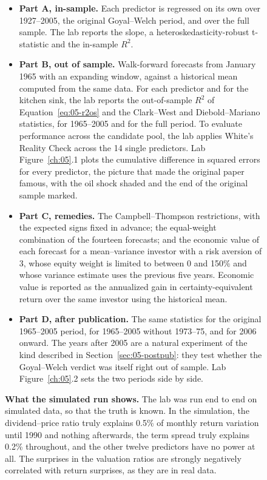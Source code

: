 \begin{figure}[htbp]
\begin{itemize}
  \item \textbf{Part A, in-sample.} Each predictor is regressed on its own over 1927--2005, the original Goyal--Welch period, and over the full sample. The lab reports the slope, a heteroskedasticity-robust t-statistic and the in-sample $R^2$.
  \item \textbf{Part B, out of sample.} Walk-forward forecasts from January 1965 with an expanding window, against a historical mean computed from the same data. For each predictor and for the kitchen sink, the lab reports the out-of-sample $R^2$ of Equation~\eqref{eq:05-r2os} and the Clark--West and Diebold--Mariano statistics, for 1965--2005 and for the full period. To evaluate performance across the candidate pool, the lab applies White's Reality Check across the 14 single predictors. Lab Figure~\ref{ch:05}.1 plots the cumulative difference in squared errors for every predictor, the picture that made the original paper famous, with the oil shock shaded and the end of the original sample marked.
  \item \textbf{Part C, remedies.} The Campbell--Thompson restrictions, with the expected signs fixed in advance; the equal-weight combination of the fourteen forecasts; and the economic value of each forecast for a mean--variance investor with a risk aversion of 3, whose equity weight is limited to between 0 and 150\% and whose variance estimate uses the previous five years. Economic value is reported as the annualized gain in certainty-equivalent return over the same investor using the historical mean.
  \item \textbf{Part D, after publication.} The same statistics for the original 1965--2005 period, for 1965--2005 without 1973--75, and for 2006 onward. The years after 2005 are a natural experiment of the kind described in Section~\ref{sec:05-postpub}: they test whether the Goyal--Welch verdict was itself right out of sample. Lab Figure~\ref{ch:05}.2 sets the two periods side by side.
\end{itemize}

\textbf{What the simulated run shows.} The lab was run end to end on simulated data, so that the truth is known. In the simulation, the dividend--price ratio truly explains 0.5\% of monthly return variation until 1990 and nothing afterwards, the term spread truly explains 0.2\% throughout, and the other twelve predictors have no power at all. The surprises in the valuation ratios are strongly negatively correlated with return surprises, as they are in real data.


\end{figure}
